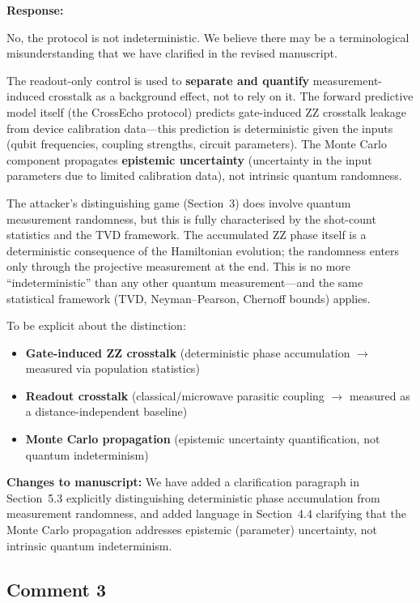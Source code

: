 \documentclass[11pt,a4paper]{article}
\begin{document}
\medskip\noindent\textbf{Response:}

No, the protocol is not indeterministic. We believe there may be a terminological
misunderstanding that we have clarified in the revised manuscript.

The readout-only control is used to \textbf{separate and quantify} measurement-induced
crosstalk as a background effect, not to rely on it. The forward predictive model itself
(the CrossEcho protocol) predicts gate-induced ZZ crosstalk leakage from device calibration
data---this prediction is deterministic given the inputs (qubit frequencies, coupling
strengths, circuit parameters). The Monte Carlo component propagates \textbf{epistemic
uncertainty} (uncertainty in the input parameters due to limited calibration data), not
intrinsic quantum randomness.

The attacker's distinguishing game (Section~3) does involve quantum measurement randomness,
but this is fully characterised by the shot-count statistics and the TVD framework. The
accumulated ZZ phase itself is a deterministic consequence of the Hamiltonian evolution;
the randomness enters only through the projective measurement at the end. This is no more
``indeterministic'' than any other quantum measurement---and the same statistical framework
(TVD, Neyman--Pearson, Chernoff bounds) applies.

To be explicit about the distinction:
\begin{itemize}[leftmargin=*]
    \item \textbf{Gate-induced ZZ crosstalk} (deterministic phase accumulation
    $\rightarrow$ measured via population statistics)
    \item \textbf{Readout crosstalk} (classical/microwave parasitic coupling $\rightarrow$
    measured as a distance-independent baseline)
    \item \textbf{Monte Carlo propagation} (epistemic uncertainty quantification, not
    quantum indeterminism)
\end{itemize}

\medskip\noindent\textbf{Changes to manuscript:} We have added a clarification paragraph
in Section~5.3 explicitly distinguishing deterministic phase accumulation from measurement
randomness, and added language in Section~4.4 clarifying that the Monte Carlo propagation
addresses epistemic (parameter) uncertainty, not intrinsic quantum indeterminism.

\subsection*{Comment 3}
\end{document}
